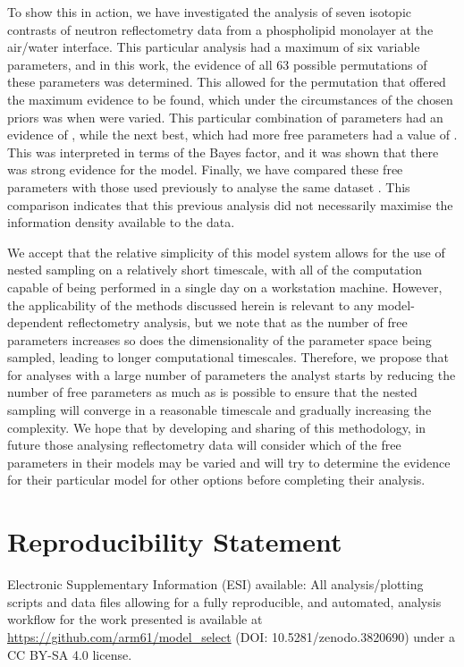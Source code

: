 \documentclass[
 reprint,
 superscriptaddress,
 amsmath,amssymb,
 aps,
]{revtex4-1}
\begin{document}
To show this in action, we have investigated the analysis of seven isotopic contrasts of neutron reflectometry data from a phospholipid monolayer at the air/water interface. 
This particular analysis had a maximum of six variable parameters, and in this work, the evidence of all \num{63} possible permutations of these parameters was determined. 
This allowed for the permutation that offered the maximum evidence to be found, which under the circumstances of the chosen priors was when  were varied. 
This particular combination of parameters had an evidence of , while the next best, which had more free parameters had a value of . 
This was interpreted in terms of the Bayes factor, and it was shown that there was strong evidence for the  model.  
Finally, we have compared these free parameters with those used previously to analyse the same dataset \cite{mccluskey_assessing_2019}. 
This comparison indicates that this previous analysis did not necessarily maximise the information density available to the data. 

We accept that the relative simplicity of this model system allows for the use of nested sampling on a relatively short timescale, with all of the computation capable of being performed in a single day on a workstation machine. 
However, the applicability of the methods discussed herein is relevant to any model-dependent reflectometry analysis, but we note that as the number of free parameters increases so does the dimensionality of the parameter space being sampled, leading to longer computational timescales. 
Therefore, we propose that for analyses with a large number of parameters the analyst starts by reducing the number of free parameters as much as is possible to ensure that the nested sampling will converge in a reasonable timescale and gradually increasing the complexity. 
We hope that by developing and sharing of this methodology, in future those analysing reflectometry data will consider which of the free parameters in their models may be varied and will try to determine the evidence for their particular model for other options before completing their analysis. 

\section*{Reproducibility Statement}

Electronic Supplementary Information (ESI) available: All analysis/plotting scripts and data files allowing for a fully reproducible, and automated, analysis workflow for the work presented is available at \url{https://github.com/arm61/model_select} (DOI: 10.5281/zenodo.3820690) under a CC BY-SA 4.0 license.
\end{document}
